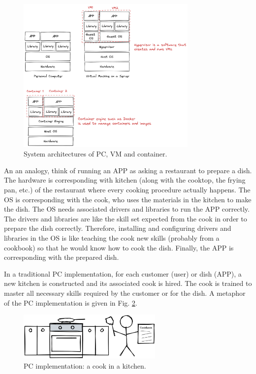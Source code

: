 \begin{figure}
	\centering
	\includegraphics[width=250pt]{chapters/ch_virtualization_and_containerization/figures/pcvmcontainerstructure.png}
	\caption{System architectures of PC, VM and container.} \label{ch:vac:fig:pcvmcontainersructure}
\end{figure}

An an analogy, think of running an APP as asking a restaurant to prepare a dish. The hardware is corresponding with kitchen (along with the cooktop, the frying pan, etc.) of the restaurant where every cooking procedure actually happens. The OS is corresponding with the cook, who uses the materials in the kitchen to make the dish. The OS needs associated drivers and libraries to run the APP correctly. The drivers and libraries are like the skill set expected from the cook in order to prepare the dish correctly. Therefore, installing and configuring drivers and libraries in the OS is like teaching the cook new skills (probably from a cookbook) so that he would know how to cook the dish. Finally, the APP is corresponding with the prepared dish.

In a traditional PC implementation, for each customer (user) or dish (APP), a new kitchen is constructed and its associated cook is hired. The cook is trained to master all necessary skills required by the customer or for the dish. A metaphor of the PC implementation is given in Fig. \ref{ch:vac:fig:acookinakitchen}.
\begin{figure}
	\centering
	\includegraphics[width=200pt]{chapters/ch_virtualization_and_containerization/figures/acookinakitchen.png}
	\caption{PC implementation: a cook in a kitchen.} \label{ch:vac:fig:acookinakitchen}
\end{figure}

